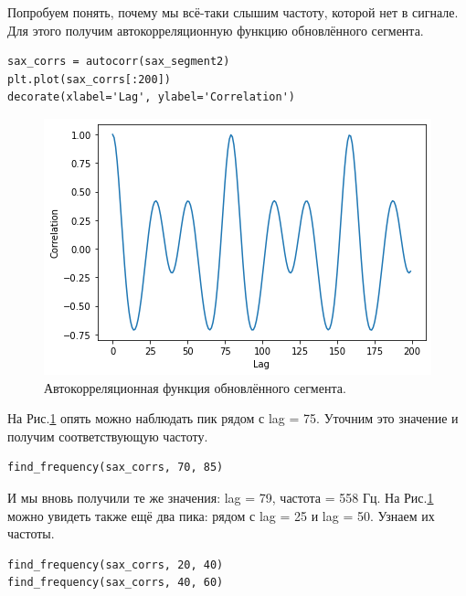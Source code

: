 \documentclass[a4paper, 14pt]{extarticle}
\begin{document}
    Попробуем понять, почему мы всё-таки слышим частоту, которой нет в сигнале. Для этого получим автокорреляционную
    функцию обновлённого сегмента.

    \begin{lstlisting}[caption= Получение автокорреляционной функции обновлённого сегмента., label={lst:task4_autocorr_without_fund}]
sax_corrs = autocorr(sax_segment2)
plt.plot(sax_corrs[:200])
decorate(xlabel='Lag', ylabel='Correlation')    \end{lstlisting}

    \begin{figure}[h]
        \centering
        \includegraphics[width=0.8\linewidth]{resources/Images/task4_autocorr_without_fund}
        \caption{Автокорреляционная функция обновлённого сегмента.}
        \label{fig:task4_autocorr_without_fund}
    \end{figure}

    На Рис.\ref{fig:task4_autocorr_without_fund} опять можно наблюдать пик рядом с lag = 75.
    Уточним это значение и получим соответствующую частоту.

    \begin{lstlisting}[caption= Получение частоты пика., label={lst:task4_find_without_fund}]
find_frequency(sax_corrs, 70, 85)   \end{lstlisting}

    И мы вновь получили те же значения: lag = 79, частота = 558 Гц. На Рис.\ref{fig:task4_autocorr_without_fund} можно
    увидеть также ещё два пика: рядом с lag = 25 и lag = 50. Узнаем их частоты.

    \begin{lstlisting}[caption= Получение частот других пиков., label={lst:task4_find_others}]
find_frequency(sax_corrs, 20, 40)
find_frequency(sax_corrs, 40, 60)   \end{lstlisting}
\end{document}
